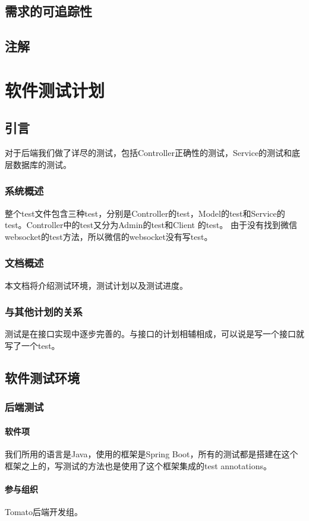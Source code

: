 \documentclass{article}
\begin{document}
\subsection{需求的可追踪性}

\subsection{注解}

\section{软件测试计划}
\label{软件测试计划}
\subsection{引言}
对于后端我们做了详尽的测试，包括Controller正确性的测试，Service的测试和底层数据库的测试。
\subsubsection{系统概述}
整个test文件包含三种test，分别是Controller的test，Model的test和Service的test。Controller中的test又分为Admin的test和Client 的test。 由于没有找到微信websocket的test方法，所以微信的websocket没有写test。
\subsubsection{文档概述}
本文档将介绍测试环境，测试计划以及测试进度。
\subsubsection{与其他计划的关系}
测试是在接口实现中逐步完善的。与接口的计划相辅相成，可以说是写一个接口就写了一个test。
\subsection{软件测试环境}
\subsubsection{后端测试}
\paragraph{软件项}
	我们所用的语言是Java，使用的框架是Spring Boot，所有的测试都是搭建在这个框架之上的，写测试的方法也是使用了这个框架集成的test annotations。
\paragraph{参与组织}
	Tomato后端开发组。
\end{document}
